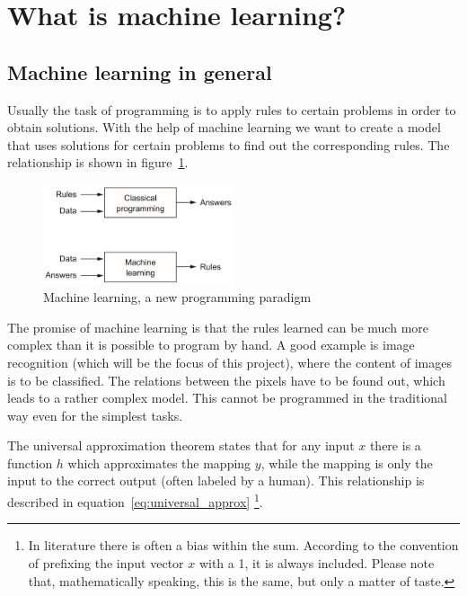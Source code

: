 \section{What is machine learning?} \label{ch:what_is_ml}

\subsection{Machine learning in general}

Usually the task of programming is to apply rules to certain problems in order to obtain solutions.
With the help of machine learning we want to create a model that uses solutions for certain problems to find out the corresponding rules.
The relationship is shown in figure~\ref{fig:cp_vs_ml}.

\begin{figure}
    \centering
    \includegraphics[width=0.5\textwidth]{images/classical_prog_vs_ml.png}
    \caption{Machine learning, a new programming paradigm \cite[p.5]{Chollet2017}}
    \label{fig:cp_vs_ml}
\end{figure}

The promise of machine learning is that the rules learned can be much more complex than it is possible to program by hand.
A good example is image recognition (which will be the focus of this project), where the content of images is to be classified.
The relations between the pixels have to be found out, which leads to a rather complex model.
This cannot be programmed in the traditional way even for the simplest tasks.

The universal approximation theorem \cite{Cybenko1989, Hornik1989} states that for any input $x$ there is a function $h$ which approximates the mapping $y$, while the mapping is only the input to the correct output (often labeled by a human).
This relationship is described in equation~\eqref{eq:universal_approx} \footnote{In literature there is often a bias within the sum.
According to the convention of prefixing the input vector $x$ with a 1, it is always included.
Please note that, mathematically speaking, this is the same, but only a matter of taste.}.

